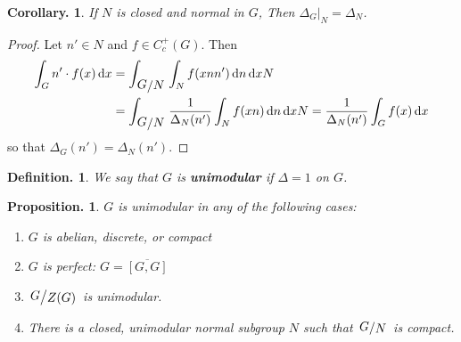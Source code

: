 \documentclass[11pt, a4paper]{memoir}
\theoremstyle{change}
\newtheorem{corollary}[theorem]{Corollary.}
\newtheorem{proposition}[theorem]{Proposition.}
\theoremstyle{plain}
\theoremstyle{nonumberplain}
\newtheorem{definition}{Definition.}
\newtheorem{proof}{Proof}
\newcommand{\quot}[2]{\mathchoice{\left.\raisebox{0.14em}{$#1$}\middle/\raisebox{-0.14em}{$#2$}\right.}
                                 {\left.\raisebox{0.08em}{$#1$}\middle/\raisebox{-0.08em}{$#2$}\right.}
                                 {\left.\raisebox{0.03em}{$#1$}\middle/\raisebox{-0.03em}{$#2$}\right.}
                                 {\left.\raisebox{0em}{$#1$}\middle/\raisebox{0em}{$#2$}\right.}}
\renewcommand{\d}[1]{\ensuremath{\operatorname{d}\!{#1}}}
\newcommand{\defn}[1]{{\boldmath\bfseries #1}}
\numberwithin{equation}{section}
\begin{document}
\begin{corollary}
    If $N$ is closed and normal in $G$, Then $\Delta_G|_N=\Delta_N$.
\end{corollary}
\begin{proof}
    Let $n'\in N$ and $f\in C_c^+(G)$.
    Then
    \begin{align*}
        \int_G n'\cdot f(x)\d{x} &=\int_{\quot{G}{N}}\int_Nf(xnn')\d{n}\d{xN}\\
                                 &= \int_{\quot{G}{N}}\frac{1}{\Delta_N(n')}\int_Nf(xn)\d{n}\d{xN}=\frac{1}{\Delta_N(n')}\int_Gf(x)\d{x}
    \end{align*}
    so that $\Delta_G(n')=\Delta_N(n')$.
\end{proof}
\begin{definition}
    We say that $G$ is \defn{unimodular} if $\Delta=1$ on $G$.
\end{definition}
\begin{proposition}
    $G$ is unimodular in any of the following cases:
    \begin{enumerate}[nl,r]
        \item $G$ is abelian, discrete, or compact
        \item $G$ is perfect: $G=\overline{[G,G]}$
        \item $\quot{G}{Z(G)}$ is unimodular.
        \item There is a closed, unimodular normal subgroup $N$ such that $\quot{G}{N}$ is compact.
    \end{enumerate}
\end{proposition}
\end{document}
